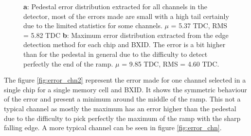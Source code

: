\documentclass[twoside,a4paper,11pt]{article}
\begin{document}
\begin{appendix}
\begin{figure}[htbp]
	\hfill
	\caption[]{\textbf{a}: Pedestal error distribution extracted for all channels in the detector, most of the errors made are small with a high tail certainly due to the limited statistics for some channels. $\mu$ = 5.37 TDC, RMS = 5.82 TDC \textbf{b}: Maximum error distribution extracted from the edge detection method for each chip and BXID. The error is a bit higher than for the pedestal in general due to the difficulty to detect perfectly the end of the ramp. $\mu$ = 9.85 TDC, RMS = 4.60 TDC.}
	\label{fig:error_dist}
\end{figure}

The figure \ref{fig:error_chn2} represent the error made for one channel selected in a single chip for a single memory cell and BXID. It shows the symmetric behaviour of the error and present a minimum around the middle of the ramp. This not a typical channel as mostly the maximum has an error higher than the pedestal due to the difficulty to pick perfectly the maximum of the ramp with the sharp falling edge. A more typical channel can be seen in figure \ref{fig:error_chn}.


\end{appendix}
\end{document}

